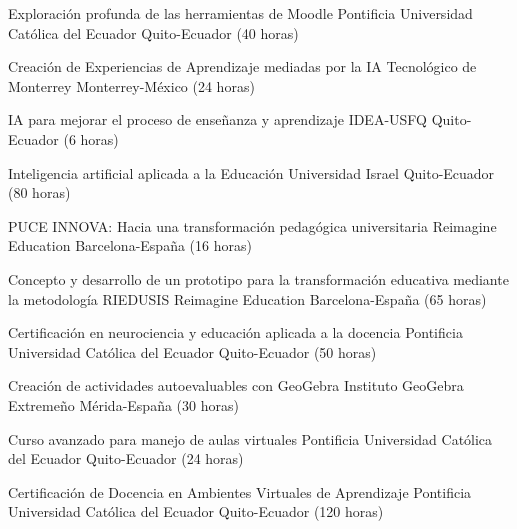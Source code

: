 \documentclass[
	a4paper,
	maincolor=cvblue!70!blue,
	sidecolor=gray!30,
	sectioncolor=cvblue!70!blue,
    sidebarwidth=7.5cm,
	topbottommargin=20pt,
	leftrightmargin=20pt,
]{fortysecondscv}
\begin{document}

    {Exploración profunda de las herramientas de Moodle}
    {Pontificia Universidad Católica del Ecuador}
    {Quito-Ecuador (40 horas)}

    {Creación de Experiencias de Aprendizaje mediadas por la IA}
    {Tecnológico de Monterrey}
    {Monterrey-México (24 horas)}

    {IA para mejorar el proceso de enseñanza y aprendizaje}
    {IDEA-USFQ}
    {Quito-Ecuador (6 horas)}

    {Inteligencia artificial aplicada a la Educación}
    {Universidad Israel}
    {Quito-Ecuador (80 horas)}

    {PUCE INNOVA: Hacia una transformación pedagógica universitaria}
    {Reimagine Education}
    {Barcelona-España (16 horas)}

    {Concepto y desarrollo de un prototipo para la transformación educativa mediante la metodología RIEDUSIS}
    {Reimagine Education}
    {Barcelona-España (65 horas)}

    {Certificación en neurociencia y educación aplicada a la docencia}
    {Pontificia Universidad Católica del Ecuador}
    {Quito-Ecuador (50 horas)}

    {Creación de actividades autoevaluables con GeoGebra}
    {Instituto GeoGebra Extremeño}
    {Mérida-España (30 horas)}

    {Curso avanzado para manejo de aulas virtuales}
    {Pontificia Universidad Católica del Ecuador}
    {Quito-Ecuador (24 horas)}

    {Certificación de Docencia en Ambientes Virtuales de Aprendizaje}
    {Pontificia Universidad Católica del Ecuador}
    {Quito-Ecuador (120 horas)}



\end{document}
